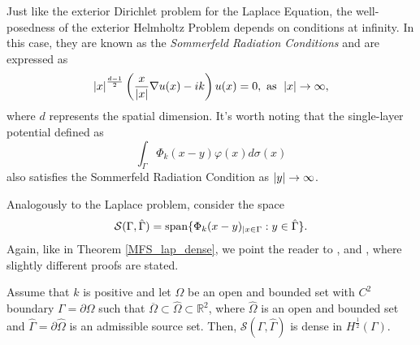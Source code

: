 \begin{remark}\label{sommerfeld_conditions}
    Just like the exterior Dirichlet problem for the Laplace Equation, the well-posedness of the exterior Helmholtz Problem depends on conditions at infinity. In this case, they are known as the \textit{Sommerfeld Radiation Conditions} and are expressed as
    \[
        \abs{x}^\frac{d-1}{2} \left(\frac{x}{\abs{x}}\nabla u(x) - i k \right)u(x) = 0, \text{ as } \; \abs{x} \rightarrow \infty,
    \]
    where \(d\) represents the spatial dimension. It's worth noting that the single-layer potential defined as
    \[
        \int_\Gamma \Phi_k(x-y) \varphi(x) d\sigma(x)
    \]
    also satisfies the Sommerfeld Radiation Condition as \(\abs{y} \rightarrow \infty\).
\end{remark}

Analogously to the Laplace problem, consider the space
\[
    \mathcal{S}(\Gamma, \hat{\Gamma}) = \operatorname{span}\{\Phi_k(x-y)_{|x \in \Gamma} : y \in \hat{\Gamma}\}.
\]
Again, like in Theorem \ref{MFS_lap_dense}, we point the reader to \cite{alves2009choice}, \cite{svilen_phd} and \cite{alves2005new}, where slightly different proofs are stated.

\begin{theorem}\label{MFS_helm_dense}
    Assume that \(k\) is positive and let \(\Omega\) be an open and bounded set with \(C^2\) boundary \(\Gamma = \partial \Omega\) such that \(\overline{\Omega} \subset \hat{\Omega} \subset \mathbb{R}^2\), where \(\hat{\Omega}\) is an open and bounded set and \(\hat{\Gamma} = \partial \hat{\Omega}\) is an admissible source set. Then, \(\mathcal{S}(\Gamma, \hat{\Gamma})\) is dense in \(H^\frac{1}{2}(\Gamma)\).
\end{theorem}

